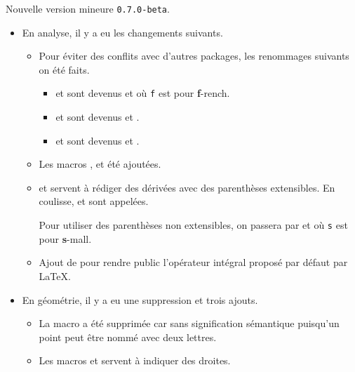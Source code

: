 Nouvelle version mineure \verb+0.7.0-beta+.

\begin{itemize}[itemsep=.5em]
    \item En analyse, il y a eu les changements suivants.
    \begin{itemize}[itemsep=.5em]
        \item Pour éviter des conflits avec d'autres packages, les renommages suivants on été faits.
        \begin{itemize}[itemsep=.5em]
            \item {} et  sont devenus  et  où \verb+f+ est pour \textbf{f}-rench.

            \item {} et  sont devenus  et .

            \item {} et  sont devenus  et .
        \end{itemize}

		\item Les macros ,  et  été ajoutées.

 		\item {} et  servent à rédiger des dérivées avec des parenthèses extensibles. En coulisse,  et  sont appelées.

        Pour utiliser des parenthèses non extensibles, on passera par  et  où \verb+s+ est pour \textbf{s}-mall.

		\item Ajout de  pour rendre public l'opérateur intégral proposé par défaut par \LaTeX.
    \end{itemize}


    \item En géométrie, il y a eu une suppression et trois ajouts.
    \begin{itemize}[itemsep=.5em]
        \item La macro  a été supprimée car sans signification sémantique puisqu'un point peut être nommé avec deux lettres.

        \item Les macros  et  servent à indiquer des droites.


\end{itemize}
\end{itemize}

